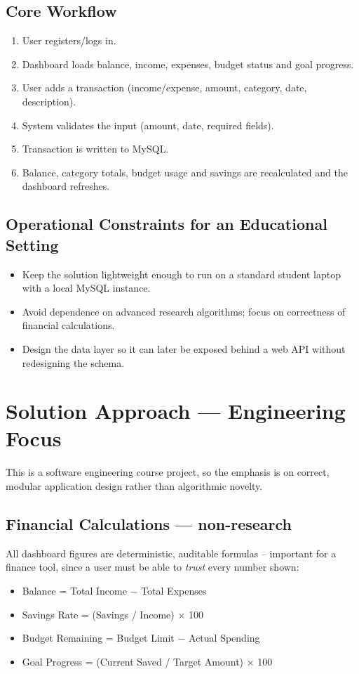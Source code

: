 \documentclass{article}
\begin{document}
\subsection{Core Workflow}
\begin{enumerate}[noitemsep]
  \item User registers/logs in.
  \item Dashboard loads balance, income, expenses, budget status and goal progress.
  \item User adds a transaction (income/expense, amount, category, date, description).
  \item System validates the input (amount, date, required fields).
  \item Transaction is written to MySQL.
  \item Balance, category totals, budget usage and savings are recalculated and the dashboard refreshes.
\end{enumerate}

\subsection{Operational Constraints for an Educational Setting}
\begin{itemize}[noitemsep]
  \item Keep the solution lightweight enough to run on a standard student laptop with a local MySQL instance.
  \item Avoid dependence on advanced research algorithms; focus on correctness of financial calculations.
  \item Design the data layer so it can later be exposed behind a web API without redesigning the schema.
\end{itemize}

\section{Solution Approach --- Engineering Focus}
This is a software engineering course project, so the emphasis is on correct, modular application design rather than algorithmic novelty.

\subsection{Financial Calculations --- non-research}
All dashboard figures are deterministic, auditable formulas -- important for a finance tool, since a user must be able to \emph{trust} every number shown:
\begin{itemize}[noitemsep]
  \item Balance = Total Income $-$ Total Expenses
  \item Savings Rate = (Savings / Income) $\times$ 100
  \item Budget Remaining = Budget Limit $-$ Actual Spending
  \item Goal Progress = (Current Saved / Target Amount) $\times$ 100
\end{itemize}
\end{document}
